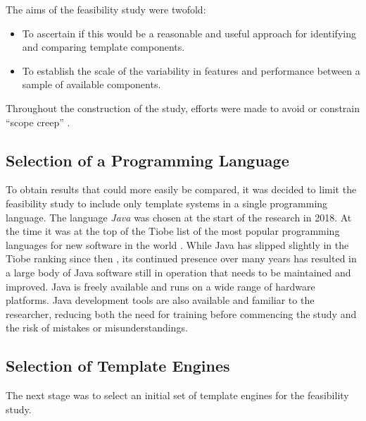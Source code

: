 \label{A118}
The aims of the feasibility study were twofold:
\begin{itemize}
    \item To ascertain if this would be a reasonable and useful approach for identifying and comparing template components.
    \item To establish the scale of the variability in features and performance between a sample of available components.
\end{itemize}
Throughout the construction of the study, efforts were made to avoid or constrain \enquote{scope creep} \citep{Heinze2014}.

\subsection{Selection of a Programming Language}

\label{language selection}
To obtain results that could more easily be compared, it was decided to limit the feasibility study to include only template systems in a single \gls{programming language}. The language \emph{Java} \citep{Oracle2018Java} was chosen at the start of the research in 2018. At the time it was at the top of the Tiobe list of the most popular \gls{programming language}s for new software in the world \citep{Tiobe2018}. While Java has slipped slightly in the Tiobe ranking since then \citep{Tiobe2024}, its continued presence over many years has resulted in a large body of Java software still in operation that needs to be maintained and improved. Java is freely available and runs on a wide range of hardware platforms. Java development tools are also available and familiar to the researcher, reducing both the need for training before commencing the study and the risk of mistakes or misunderstandings.

\subsection{Selection of Template Engines}
\label{fs:selection}

The next stage was to select an initial set of \gls{template engine}s for the feasibility study.


